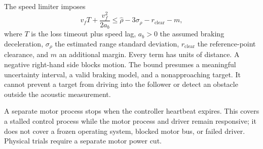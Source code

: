 The speed limiter imposes
\begin{equation}
v_fT+\frac{v_f^2}{2a_b}\le
\hat\rho-3\sigma_\rho-r_{\mathrm{clear}}-m,
\label{eq:brake}
\end{equation}
where $T$ is the loss timeout plus speed lag, $a_b>0$ the assumed braking deceleration, $\sigma_\rho$ the estimated range standard deviation, $r_{\mathrm{clear}}$ the reference-point clearance, and $m$ an additional margin. Every term has units of distance. A negative right-hand side blocks motion. The bound presumes a meaningful uncertainty interval, a valid braking model, and a nonapproaching target. It cannot prevent a target from driving into the follower or detect an obstacle outside the acoustic measurement.

A separate motor process stops when the controller heartbeat expires. This covers a stalled control process while the motor process and driver remain responsive; it does not cover a frozen operating system, blocked motor bus, or failed driver. Physical trials require a separate motor power cut.

